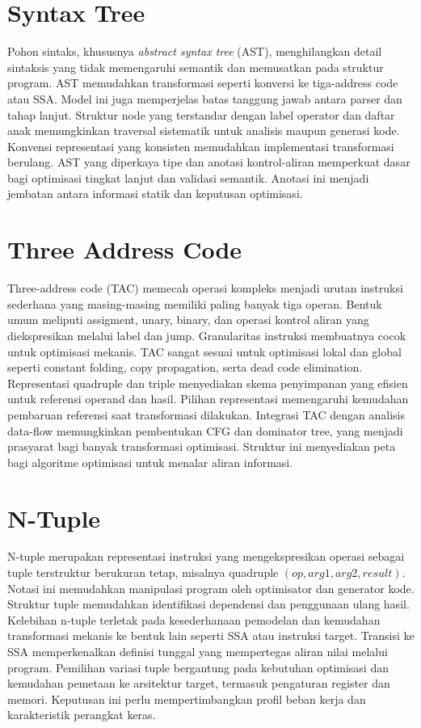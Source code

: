 \documentclass[../main.tex]{subfiles}
\begin{document}
\section{Syntax Tree}
Pohon sintaks, khususnya \textit{abstract syntax tree} (AST), menghilangkan detail sintaksis yang tidak memengaruhi semantik dan memusatkan pada struktur program. AST memudahkan transformasi seperti konversi ke tiga-address code atau SSA.\cite{aho-dragon-book-2006} Model ini juga memperjelas batas tanggung jawab antara parser dan tahap lanjut.
Struktur node yang terstandar dengan label operator dan daftar anak memungkinkan traversal sistematik untuk analisis maupun generasi kode.\cite{appel-modern} Konvensi representasi yang konsisten memudahkan implementasi transformasi berulang.
AST yang diperkaya tipe dan anotasi kontrol-aliran memperkuat dasar bagi optimisasi tingkat lanjut dan validasi semantik. Anotasi ini menjadi jembatan antara informasi statik dan keputusan optimisasi.

\section{Three Address Code}
Three-address code (TAC) memecah operasi kompleks menjadi urutan instruksi sederhana yang masing-masing memiliki paling banyak tiga operan. Bentuk umum meliputi assigment, unary, binary, dan operasi kontrol aliran yang diekspresikan melalui label dan jump.\cite{aho-dragon-book-2006} Granularitas instruksi membuatnya cocok untuk optimisasi mekanis.
TAC sangat sesuai untuk optimisasi lokal dan global seperti constant folding, copy propagation, serta dead code elimination. Representasi quadruple dan triple menyediakan skema penyimpanan yang efisien untuk referensi operand dan hasil.\cite{muchnick} Pilihan representasi memengaruhi kemudahan pembaruan referensi saat transformasi dilakukan.
Integrasi TAC dengan analisis data-flow memungkinkan pembentukan CFG dan dominator tree, yang menjadi prasyarat bagi banyak transformasi optimisasi. Struktur ini menyediakan peta bagi algoritme optimisasi untuk menalar aliran informasi.

\section{N-Tuple}
N-tuple merupakan representasi instruksi yang mengekspresikan operasi sebagai tuple terstruktur berukuran tetap, misalnya quadruple \((op, arg1, arg2, result)\). Notasi ini memudahkan manipulasi program oleh optimisator dan generator kode.\cite{muchnick} Struktur tuple memudahkan identifikasi dependensi dan penggunaan ulang hasil.
Kelebihan n-tuple terletak pada kesederhanaan pemodelan dan kemudahan transformasi mekanis ke bentuk lain seperti SSA atau instruksi target.\cite{appel-modern} Transisi ke SSA memperkenalkan definisi tunggal yang mempertegas aliran nilai melalui program.
Pemilihan variasi tuple bergantung pada kebutuhan optimisasi dan kemudahan pemetaan ke arsitektur target, termasuk pengaturan register dan memori. Keputusan ini perlu mempertimbangkan profil beban kerja dan karakteristik perangkat keras.

\IfSubfilesClassLoaded{%
\printbibliography
}{}
\end{document}
